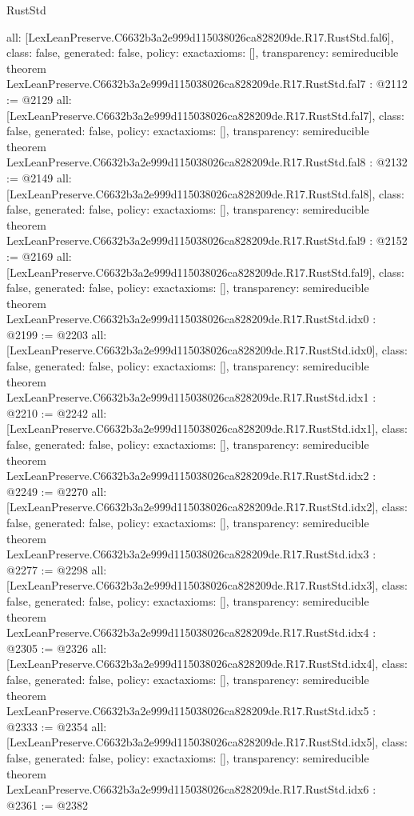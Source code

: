 \begin{lexlean}{RustStd}
\begin{coremodule}
{  all: [LexLeanPreserve.C6632b3a2e999d115038026ca828209de.R17.RustStd.fal6],
  class: false,
  generated: false,
  policy: exact{axioms: []},
  transparency: semireducible
}
theorem LexLeanPreserve.C6632b3a2e999d115038026ca828209de.R17.RustStd.fal7 : @2112 := @2129 {
  all: [LexLeanPreserve.C6632b3a2e999d115038026ca828209de.R17.RustStd.fal7],
  class: false,
  generated: false,
  policy: exact{axioms: []},
  transparency: semireducible
}
theorem LexLeanPreserve.C6632b3a2e999d115038026ca828209de.R17.RustStd.fal8 : @2132 := @2149 {
  all: [LexLeanPreserve.C6632b3a2e999d115038026ca828209de.R17.RustStd.fal8],
  class: false,
  generated: false,
  policy: exact{axioms: []},
  transparency: semireducible
}
theorem LexLeanPreserve.C6632b3a2e999d115038026ca828209de.R17.RustStd.fal9 : @2152 := @2169 {
  all: [LexLeanPreserve.C6632b3a2e999d115038026ca828209de.R17.RustStd.fal9],
  class: false,
  generated: false,
  policy: exact{axioms: []},
  transparency: semireducible
}
theorem LexLeanPreserve.C6632b3a2e999d115038026ca828209de.R17.RustStd.idx0 : @2199 := @2203 {
  all: [LexLeanPreserve.C6632b3a2e999d115038026ca828209de.R17.RustStd.idx0],
  class: false,
  generated: false,
  policy: exact{axioms: []},
  transparency: semireducible
}
theorem LexLeanPreserve.C6632b3a2e999d115038026ca828209de.R17.RustStd.idx1 : @2210 := @2242 {
  all: [LexLeanPreserve.C6632b3a2e999d115038026ca828209de.R17.RustStd.idx1],
  class: false,
  generated: false,
  policy: exact{axioms: []},
  transparency: semireducible
}
theorem LexLeanPreserve.C6632b3a2e999d115038026ca828209de.R17.RustStd.idx2 : @2249 := @2270 {
  all: [LexLeanPreserve.C6632b3a2e999d115038026ca828209de.R17.RustStd.idx2],
  class: false,
  generated: false,
  policy: exact{axioms: []},
  transparency: semireducible
}
theorem LexLeanPreserve.C6632b3a2e999d115038026ca828209de.R17.RustStd.idx3 : @2277 := @2298 {
  all: [LexLeanPreserve.C6632b3a2e999d115038026ca828209de.R17.RustStd.idx3],
  class: false,
  generated: false,
  policy: exact{axioms: []},
  transparency: semireducible
}
theorem LexLeanPreserve.C6632b3a2e999d115038026ca828209de.R17.RustStd.idx4 : @2305 := @2326 {
  all: [LexLeanPreserve.C6632b3a2e999d115038026ca828209de.R17.RustStd.idx4],
  class: false,
  generated: false,
  policy: exact{axioms: []},
  transparency: semireducible
}
theorem LexLeanPreserve.C6632b3a2e999d115038026ca828209de.R17.RustStd.idx5 : @2333 := @2354 {
  all: [LexLeanPreserve.C6632b3a2e999d115038026ca828209de.R17.RustStd.idx5],
  class: false,
  generated: false,
  policy: exact{axioms: []},
  transparency: semireducible
}
theorem LexLeanPreserve.C6632b3a2e999d115038026ca828209de.R17.RustStd.idx6 : @2361 := @2382 {
}
\end{coremodule}
\end{lexlean}
